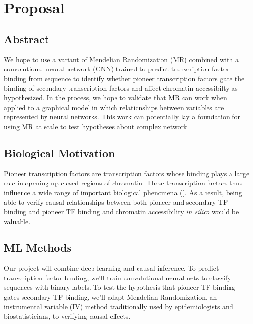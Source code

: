 \section{Proposal}
\subsection{Abstract}
We hope to use a variant of Mendelian Randomization (MR) combined with a convolutional neural network (CNN) trained to predict transcription factor binding from sequence to identify whether pioneer transcription factors gate the binding of secondary transcription factors and affect chromatin accessibilty as hypothesized. In the process, we hope to validate that MR can work when applied to a graphical model in which relationships between variables are represented by neural networks. This work can potentially lay a foundation for using MR at scale to test hypotheses about complex network 

\subsection{Biological Motivation}
Pioneer transcription factors are transcription factors whose binding plays a large role in opening up closed regions of chromatin. These transcription factors thus influence a wide range of important biological phenomena  (\cite{Lai2018-fr}). As a result, being able to verify causal relationships between both pioneer and secondary TF binding and pioneer TF binding and chromatin accessibility \textit{in silico} would be valuable.

\subsection{ML Methods} \label{sec:mlmeth}
Our project will combine deep learning and causal inference. To predict transcription factor binding, we'll train convolutional neural nets to classify sequences with binary labels. To test the hypothesis that pioneer TF binding gates secondary TF binding, we'll adapt Mendelian Randomization, an instrumental variable (IV) method traditionally used by epidemiologists and biostatisticians, to verifying causal effects.

